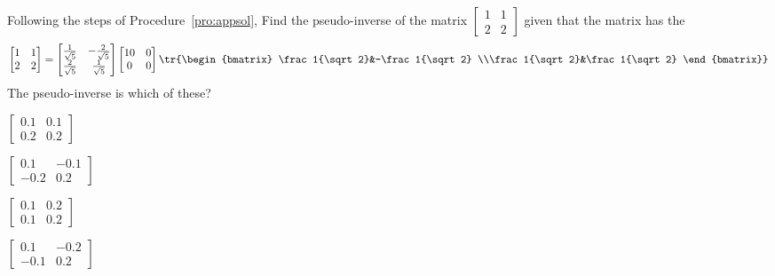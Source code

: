 \begin{activity}
Following the steps of Procedure~\ref{pro:appsol}, Find the pseudo-inverse of the matrix {\small\(\begin{bmatrix} 1&1\\2&2 \end{bmatrix}\)} given that the matrix has the \svd
\begin{equation*}
\begin{bmatrix} 1&1\\2&2 \end{bmatrix}
=\begin{bmatrix} \frac1{\sqrt5}&-\frac2{\sqrt5}
\\\frac2{\sqrt5}&\frac1{\sqrt5} \end{bmatrix}
\begin{bmatrix} 10&0\\0&0 \end{bmatrix}
\tr{\begin{bmatrix} \frac1{\sqrt2}&-\frac1{\sqrt2}
\\\frac1{\sqrt2}&\frac1{\sqrt2} \end{bmatrix}}
\end{equation*}
The pseudo-inverse is which of these?
\begin{parts}
\item \(\begin{bmatrix} 0.1&0.1\\0.2&0.2 \end{bmatrix}\)
\item \(\begin{bmatrix} 0.1&-0.1\\-0.2&0.2 \end{bmatrix}\)
\item \(\begin{bmatrix} 0.1&0.2\\0.1&0.2 \end{bmatrix}\)%
\item \(\begin{bmatrix} 0.1&-0.2\\-0.1&0.2 \end{bmatrix}\)
\end{parts}
\end{activity}





